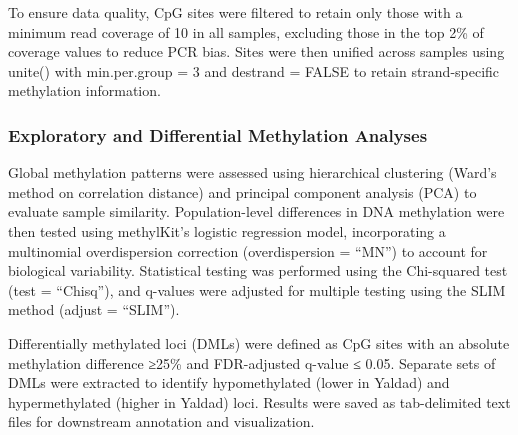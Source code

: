 \documentclass[
]{agujournal2019}
\begin{document}
To ensure data quality, CpG sites were filtered to retain only those
with a minimum read coverage of 10 in all samples, excluding those in
the top 2\% of coverage values to reduce PCR bias. Sites were then
unified across samples using unite() with min.per.group = 3 and destrand
= FALSE to retain strand-specific methylation information.

\subsubsection{Exploratory and Differential Methylation
Analyses}\label{exploratory-and-differential-methylation-analyses}

Global methylation patterns were assessed using hierarchical clustering
(Ward's method on correlation distance) and principal component analysis
(PCA) to evaluate sample similarity. Population-level differences in DNA
methylation were then tested using methylKit's logistic regression
model, incorporating a multinomial overdispersion correction
(overdispersion = ``MN'') to account for biological variability.
Statistical testing was performed using the Chi-squared test (test =
``Chisq''), and q-values were adjusted for multiple testing using the
SLIM method (adjust = ``SLIM'').

Differentially methylated loci (DMLs) were defined as CpG sites with an
absolute methylation difference ≥25\% and FDR-adjusted q-value ≤ 0.05.
Separate sets of DMLs were extracted to identify hypomethylated (lower
in Yaldad) and hypermethylated (higher in Yaldad) loci. Results were
saved as tab-delimited text files for downstream annotation and
visualization.
\end{document}
